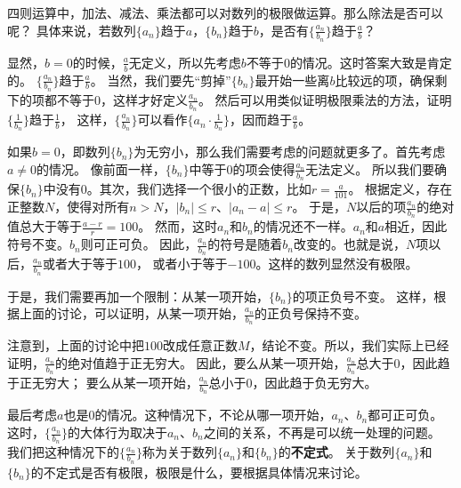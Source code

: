 \documentclass[12pt,UTF8]{ctexbook}
\newtheorem{sk}{思考}[section]
\begin{document}
四则运算中，加法、减法、乘法都可以对数列的极限做运算。那么除法是否可以呢？
具体来说，若数列$\{a_n\}$趋于$a$，$\{b_n\}$趋于$b$，是否有$\{\frac{a_n}{b_n}\}$趋于$\frac{a}{b}$？

显然，$b=0$的时候，$\frac{a}{b}$无定义，所以先考虑$b$不等于$0$的情况。这时答案大致是肯定的。
$\{\frac{a_n}{b_n}\}$趋于$\frac{a}{b}$。
当然，我们要先“剪掉”$\{b_n\}$最开始一些离$b$比较远的项，确保剩下的项都不等于$0$，这样才好定义$\frac{a_n}{b_n}$。
然后可以用类似证明极限乘法的方法，证明$\{\frac{1}{b_n}\}$趋于$\frac{1}{b}$，
这样，$\{\frac{a_n}{b_n}\}$可以看作$\{a_n \cdot \frac{1}{b_n}\}$，因而趋于$\frac{a}{b}$。

如果$b=0$，即数列$\{b_n\}$为无穷小，那么我们需要考虑的问题就更多了。首先考虑$a\neq 0$的情况。
像前面一样，$\{b_n\}$中等于$0$的项会使得$\frac{a_n}{b_n}$无法定义。
所以我们要确保$\{b_n\}$中没有$0$。其次，我们选择一个很小的正数，比如$r=\frac{a}{101}$。
根据定义，存在正整数$N$，使得对所有$n>N$，$|b_n| \leqslant r$、$|a_n - a| \leqslant r$。
于是，$N$以后的项$\frac{a_n}{b_n}$的绝对值总大于等于$\frac{a - r}{r} = 100$。
然而，这时$a_n$和$b_n$的情况还不一样。$a_n$和$a$相近，因此符号不变。$b_n$则可正可负。
因此，$\frac{a_n}{b_n}$的符号是随着$b_n$改变的。也就是说，$N$项以后，$\frac{a_n}{b_n}$或者大于等于$100$，
或者小于等于$-100$。这样的数列显然没有极限。

于是，我们需要再加一个限制：从某一项开始，$\{b_n\}$的项正负号不变。
这样，根据上面的讨论，可以证明，从某一项开始，$\frac{a_n}{b_n}$的正负号保持不变。

注意到，上面的讨论中把$100$改成任意正数$M$，结论不变。所以，我们实际上已经证明，$\frac{a_n}{b_n}$的绝对值趋于正无穷大。
因此，要么从某一项开始，$\frac{a_n}{b_n}$总大于$0$，因此趋于正无穷大；
要么从某一项开始，$\frac{a_n}{b_n}$总小于$0$，因此趋于负无穷大。

最后考虑$a$也是$0$的情况。这种情况下，不论从哪一项开始，$a_n$、$b_n$都可正可负。
这时，$\{\frac{a_n}{b_n}\}$的大体行为取决于$a_n$、$b_n$之间的关系，不再是可以统一处理的问题。
我们把这种情况下的$\{\frac{a_n}{b_n}\}$称为关于数列$\{a_n\}$和$\{b_n\}$的\textbf{不定式}。
关于数列$\{a_n\}$和$\{b_n\}$的不定式是否有极限，极限是什么，要根据具体情况来讨论。

\end{document}
